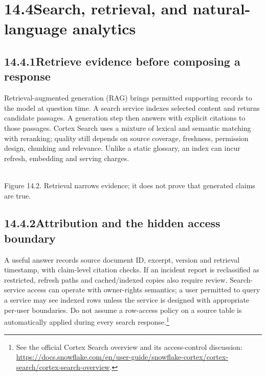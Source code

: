 \documentclass[11pt,twoside]{article}
\newcommand{\topic}[2]{\subsection*{#1\quad #2}}
\begin{document}
\section*{14.4\quad Search, retrieval, and natural-language analytics}
\topic{14.4.1}{Retrieve evidence before composing a response}
Retrieval-augmented generation (RAG) brings permitted supporting records to the model at question time. A search service indexes selected content and returns candidate passages. A generation step then answers with explicit citations to those passages. Cortex Search uses a mixture of lexical and semantic matching with reranking; quality still depends on source coverage, freshness, permission design, chunking and relevance. Unlike a static glossary, an index can incur refresh, embedding and serving charges.
\begin{center}\\{\fontsize{8}{9}\selectfont\color{inkgray}Figure 14.2. Retrieval narrows evidence; it does not prove that generated claims are true.}\end{center}
\topic{14.4.2}{Attribution and the hidden access boundary}
A useful answer records source document ID, excerpt, version and retrieval timestamp, with claim-level citation checks. If an incident report is reclassified as restricted, refresh paths and cached/indexed copies also require review. Search-service access can operate with owner-rights semantics; a user permitted to query a service may see indexed rows unless the service is designed with appropriate per-user boundaries. Do not assume a row-access policy on a source table is automatically applied during every search response.\footnote{See the official Cortex Search overview and its access-control discussion: \url{https://docs.snowflake.com/en/user-guide/snowflake-cortex/cortex-search/cortex-search-overview}.}
\end{document}

